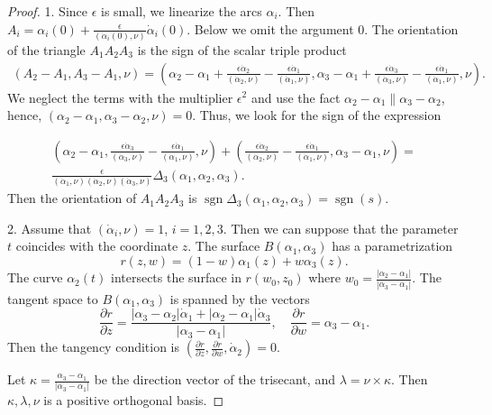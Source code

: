 \documentclass{article}
\theoremstyle{definition}
\theoremstyle{remark}
\DeclareMathOperator{\sgn}{\mathrm{sgn}}
\begin{document}
\begin{proof}
    1. Since $\epsilon$ is small, we linearize the arcs $\alpha_i$. Then $A_i=\alpha_i(0)+\frac{\epsilon}{(\dot\alpha_i(0),\nu)}\dot\alpha_i(0)$. Below we omit the argument $0$. The orientation of the triangle $A_1A_2A_3$ is the sign of the scalar triple product
\begin{multline*}
    (A_2-A_1,A_3-A_1,\nu)=(\alpha_2-\alpha_1+\frac{\epsilon\dot\alpha_2}{(\dot\alpha_2,\nu)}-\frac{\epsilon\dot\alpha_1}{(\dot\alpha_1,\nu)},\alpha_3-\alpha_1+\frac{\epsilon\dot\alpha_3}{(\dot\alpha_3,\nu)}-\frac{\epsilon\dot\alpha_1}{(\dot\alpha_1,\nu)},\nu).
\end{multline*}
We neglect the terms with the multiplier $\epsilon^2$ and use the fact $\alpha_2-\alpha_1\parallel\alpha_3-\alpha_2$, hence, $(\alpha_2-\alpha_1,\alpha_3-\alpha_2,\nu)=0$. Thus, we look for the sign of the expression

\begin{multline*}
    (\alpha_2-\alpha_1,\frac{\epsilon\dot\alpha_3}{(\dot\alpha_3,\nu)}-\frac{\epsilon\dot\alpha_1}{(\dot\alpha_1,\nu)},\nu)+
     (\frac{\epsilon\dot\alpha_2}{(\dot\alpha_2,\nu)}-\frac{\epsilon\dot\alpha_1}{(\dot\alpha_1,\nu)},\alpha_3-\alpha_1,\nu)=\\
     \frac{\epsilon}{(\dot\alpha_1,\nu)(\dot\alpha_2,\nu)(\dot\alpha_3,\nu)}\Delta_3(\alpha_1,\alpha_2,\alpha_3).
\end{multline*}
Then the orientation of $A_1A_2A_3$ is $\sgn\Delta_3(\alpha_1,\alpha_2,\alpha_3)=\sgn(s)$.

2. Assume that $(\dot\alpha_i,\nu)=1$, $i=1,2,3$. Then we can suppose that the parameter $t$ coincides with the coordinate $z$. The surface $B(\alpha_1,\alpha_3)$ has a parametrization
\[
r(z,w)=(1-w)\alpha_1(z)+w\alpha_3(z).
\]
The curve $\alpha_2(t)$ intersects the surface in $r(w_0,z_0)$ where $w_0=\frac{|\alpha_2-\alpha_1|}{|\alpha_3-\alpha_1|}$. The tangent space to $B(\alpha_1,\alpha_3)$ is spanned by the vectors
\[
\frac{\partial r}{\partial z}=\frac{|\alpha_3-\alpha_2|\dot\alpha_1+|\alpha_2-\alpha_1|\dot\alpha_3}{|\alpha_3-\alpha_1|}, \quad
\frac{\partial r}{\partial w}=\alpha_3-\alpha_1.
\]
Then the tangency condition is $(\frac{\partial r}{\partial z},\frac{\partial r}{\partial w},\dot\alpha_2)=0$.

Let $\kappa=\frac{\alpha_3-\alpha_1}{|\alpha_3-\alpha_1|}$ be the direction vector of the trisecant, and $\lambda=\nu\times\kappa$. Then $\kappa,\lambda,\nu$ is a positive orthogonal basis.


\end{proof}
\end{document}
